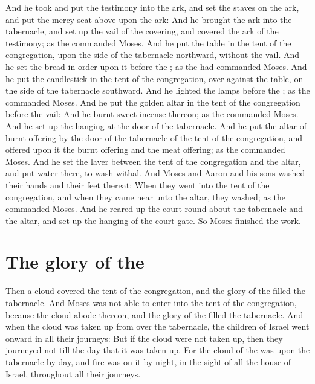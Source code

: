 \begin{biblechapter}
\verse And he took and put the testimony into the ark, and set the staves on the ark, and put the mercy seat above upon the ark:
\verse And he brought the ark into the tabernacle, and set up the vail of the covering, and covered the ark of the testimony; as the \LORD commanded Moses.
\verse And he put the table in the tent of the congregation, upon the side of the tabernacle northward, without the vail.
\verse And he set the bread in order upon it before the \LORD; as the \LORD had commanded Moses.
\verse And he put the candlestick in the tent of the congregation, over against the table, on the side of the tabernacle southward.
\verse And he lighted the lamps before the \LORD; as the \LORD commanded Moses.
\verse And he put the golden altar in the tent of the congregation before the vail:
\verse And he burnt sweet incense thereon; as the \LORD commanded Moses.
\verse And he set up the hanging at the door of the tabernacle.
\verse And he put the altar of burnt offering by the door of the tabernacle of the tent of the congregation, and offered upon it the burnt offering and the meat offering; as the \LORD commanded Moses.
\verse And he set the laver between the tent of the congregation and the altar, and put water there, to wash withal.
\verse And Moses and Aaron and his sons washed their hands and their feet thereat:
\verse When they went into the tent of the congregation, and when they came near unto the altar, they washed; as the \LORD commanded Moses.
\verse And he reared up the court round about the tabernacle and the altar, and set up the hanging of the court gate. So Moses finished the work.
\section*{The glory of the \LORD}
\verse Then a cloud covered the tent of the congregation, and the glory of the \LORD filled the tabernacle.
\verse And Moses was not able to enter into the tent of the congregation, because the cloud abode thereon, and the glory of the \LORD filled the tabernacle.
\verse And when the cloud was taken up from over the tabernacle, the children of Israel went onward in all their journeys:
\verse But if the cloud were not taken up, then they journeyed not till the day that it was taken up.
\verse For the cloud of the \LORD was upon the tabernacle by day, and fire was on it by night, in the sight of all the house of Israel, throughout all their journeys.
\end{biblechapter}
